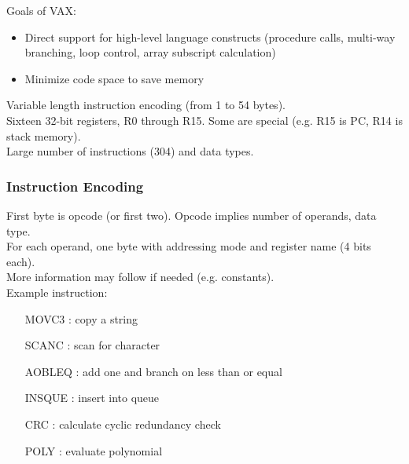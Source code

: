 \documentclass[12pt]{article}
\theoremstyle{definition}
\begin{document}
  Goals of VAX:
  \begin{itemize}
    \item Direct support for high-level language constructs (procedure calls, multi-way branching, loop control, array subscript calculation)
    \item Minimize code space to save memory
  \end{itemize}

  Variable length instruction encoding (from 1 to 54 bytes). \\
  Sixteen 32-bit registers, R0 through R15.
  Some are special (e.g. R15 is PC, R14 is stack memory). \\
  Large number of instructions (304) and data types.

  \subsubsection{Instruction Encoding}
  First byte is opcode (or first two).
  Opcode implies number of operands, data type. \\
  For each operand, one byte with addressing mode and register name (4 bits each). \\
  More information may follow if needed (e.g. constants). \\

  Example instruction:
  \begin{itemize}
    \item[MOVC3] : copy a string
    \item[SCANC] : scan for character
    \item[AOBLEQ] : add one and branch on less than or equal
    \item[INSQUE] : insert into queue
    \item[CRC] : calculate cyclic redundancy check
    \item[POLY] : evaluate polynomial
  \end{itemize}

  \newpage
\end{document}
